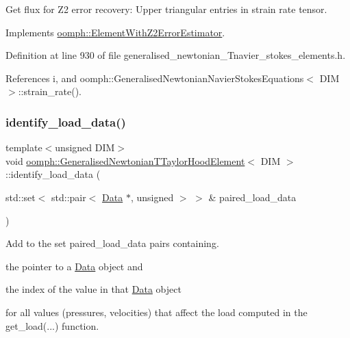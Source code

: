 Get \textquotesingle{}flux\textquotesingle{} for Z2 error recovery\+: Upper triangular entries in strain rate tensor. 



Implements \hyperlink{classoomph_1_1ElementWithZ2ErrorEstimator_a5688ff5f546d81771cabad82ca5a7556}{oomph\+::\+Element\+With\+Z2\+Error\+Estimator}.



Definition at line 930 of file generalised\+\_\+newtonian\+\_\+\+Tnavier\+\_\+stokes\+\_\+elements.\+h.



References i, and oomph\+::\+Generalised\+Newtonian\+Navier\+Stokes\+Equations$<$ D\+I\+M $>$\+::strain\+\_\+rate().

\mbox{\label{classoomph_1_1GeneralisedNewtonianTTaylorHoodElement_ac6da3eea70b3ad498c42a91dc9c67237}} 
\subsubsection{\texorpdfstring{identify\+\_\+load\+\_\+data()}{identify\_load\_data()}}
{\footnotesize\ttfamily template$<$unsigned D\+IM$>$ \\
void \hyperlink{classoomph_1_1GeneralisedNewtonianTTaylorHoodElement}{oomph\+::\+Generalised\+Newtonian\+T\+Taylor\+Hood\+Element}$<$ D\+IM $>$\+::identify\+\_\+load\+\_\+data (\begin{DoxyParamCaption}\item[{std\+::set$<$ std\+::pair$<$ \hyperlink{classoomph_1_1Data}{Data} $\ast$, unsigned $>$ $>$ \&}]{paired\+\_\+load\+\_\+data }\end{DoxyParamCaption})\hspace{0.3cm}{\ttfamily [virtual]}}



Add to the set {\ttfamily paired\+\_\+load\+\_\+data} pairs containing. 


\begin{DoxyItemize}
\item the pointer to a \hyperlink{classoomph_1_1Data}{Data} object and
\item the index of the value in that \hyperlink{classoomph_1_1Data}{Data} object
\end{DoxyItemize}for all values (pressures, velocities) that affect the load computed in the {\ttfamily get\+\_\+load}(...) function.

